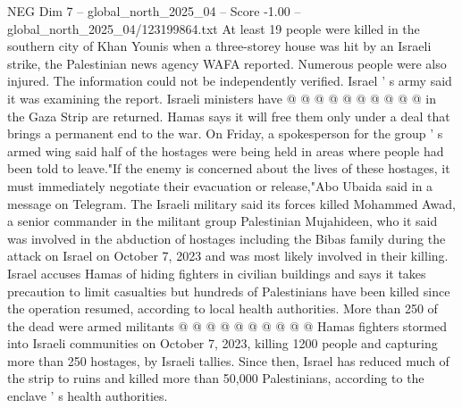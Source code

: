 \begin{textsample}{NEG Dim 7 – global\_north\_2025\_04 – Score -1.00 – global\_north\_2025\_04/123199864.txt}
At least 19 people were killed in the southern city of Khan Younis when a three-storey house was hit by an Israeli strike, the Palestinian news agency WAFA reported.
Numerous people were also injured.
The information could not be independently verified.
Israel ' s army said it was examining the report.
Israeli ministers have @ @ @ @ @ @ @ @ @ @ in the Gaza Strip are returned.
Hamas says it will free them only under a deal that brings a permanent end to the war.
On Friday, a spokesperson for the group ' s armed wing said half of the hostages were being held in areas where people had been told to leave."If the enemy is concerned about the lives of these hostages, it must immediately negotiate their evacuation or release,"Abo Ubaida said in a message on Telegram.
The Israeli military said its forces killed Mohammed Awad, a senior commander in the militant group Palestinian Mujahideen, who it said was involved in the abduction of hostages including the Bibas family during the attack on Israel on October 7, 2023 and was most likely involved in their killing.
Israel accuses Hamas of hiding fighters in civilian buildings and says it takes precaution to limit casualties but hundreds of Palestinians have been killed since the operation resumed, according to local health authorities.
More than 250 of the dead were armed militants @ @ @ @ @ @ @ @ @ @ Hamas fighters stormed into Israeli communities on October 7, 2023, killing 1200 people and capturing more than 250 hostages, by Israeli tallies.
Since then, Israel has reduced much of the strip to ruins and killed more than 50,000 Palestinians, according to the enclave ' s health authorities.

\end{textsample}
